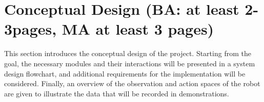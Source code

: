 \chapter{Conceptual Design (BA: at least 2-3pages, MA at least 3 pages)}
This section introduces the conceptual design of the project. Starting from the goal, the necessary modules and their interactions will be presented in a system design flowchart, and additional requirements for the implementation will be considered. Finally, an overview of the observation and action spaces of the robot are given to illustrate the data that will be recorded in demonstrations.



